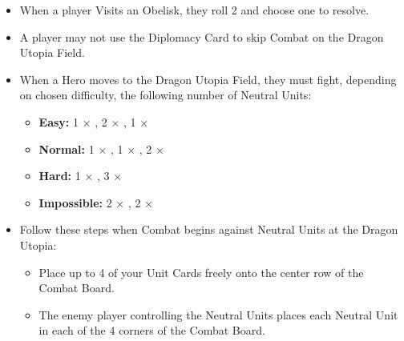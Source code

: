 \begin{multicols*}{2}
\begin{itemize}
  \item When a player Visits an Obelisk, they roll 2  and choose one to resolve.
  \item A player may not use the Diplomacy Card to skip Combat on the Dragon Utopia Field.
  \item When a Hero moves to the Dragon Utopia Field, they must fight, depending on chosen difficulty, the following number of Neutral Units:
  \begin{itemize}
    \item \textbf{Easy:} 1 × , 2 × , 1 × 
    \item \textbf{Normal:} 1 × , 1 × , 2 × 
    \item \textbf{Hard:} 1 × , 3 × 
    \item \textbf{Impossible:}  2 × , 2 × 
  \end{itemize}
  \item Follow these steps when Combat begins against Neutral Units at the Dragon Utopia:
  \begin{itemize}
    \item Place up to 4 of your Unit Cards freely onto the center row of the Combat Board.
    \item The enemy player controlling the Neutral Units places each Neutral Unit in each of the 4 corners of the Combat Board.
  \end{itemize}
\end{itemize}


\end{multicols*}
